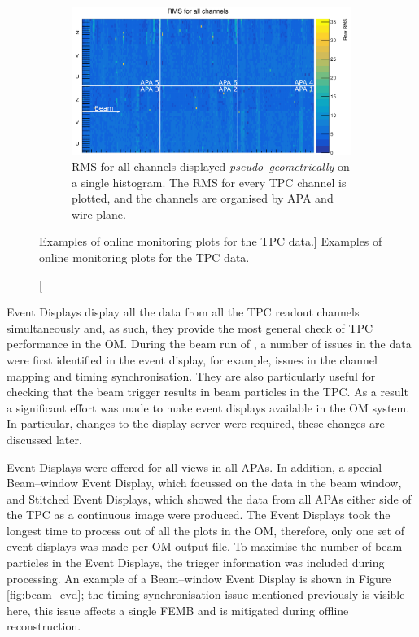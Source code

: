 \begin{figure}
	\begin{subfigure}[b]{0.75\textwidth}
		\centering
		\vspace{3mm}
		\includegraphics[width=\textwidth]{figures/all_chan_rms.png}
		\caption {RMS for all channels displayed \emph{pseudo--geometrically} on a 
		single histogram. The RMS for every TPC channel is plotted, and the channels 
		are organised by APA and wire plane.} 
		\label{fig:ped_noise}
	\end{subfigure}

	\caption
	[Examples of online monitoring plots for the TPC data.]
	{Examples of online monitoring plots for the TPC data.}
	\label{fig:tpc_om}

\end{figure}

Event Displays display all the data from all the TPC readout channels
simultaneously and, as such, they provide the most general check of TPC 
performance in the OM. During the beam run of \protodune{}, a number of issues 
in the data were first identified in the event display, for example, issues in 
the channel mapping and timing synchronisation. They are also particularly 
useful for checking that the beam trigger results in beam particles in the 
TPC. As a result a significant effort was made to make event displays 
available in the \protodune{} OM system. In particular, changes to the display 
server were required, these changes are discussed later. 

Event Displays were offered for all views in all APAs. In addition, a special 
Beam--window Event Display, which focussed on the data in the beam window, and 
Stitched Event Displays, which showed the data from all APAs either side of the
TPC as a continuous image were produced. The Event Displays took the longest 
time to process out of all the plots in the OM, therefore, only one set of 
event displays was made per OM output file. To maximise the number of beam 
particles in the Event Displays, the trigger information was included during 
processing. An example of a Beam--window Event Display is shown in Figure 
\ref{fig:beam_evd}; the timing synchronisation issue mentioned previously is 
visible here, this issue affects a single FEMB and is mitigated during offline 
reconstruction.  


